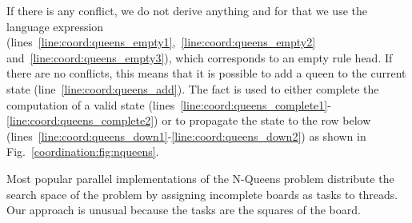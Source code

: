 If there is any conflict, we do not derive anything and for that we use the
language expression 
(lines~\ref{line:coord:queens_empty1},~\ref{line:coord:queens_empty2}
and~\ref{line:coord:queens_empty3}), which corresponds to an empty rule head. If
there are no conflicts, this means that it is possible to add a queen to the
current state (line~\ref{line:coord:queens_add}). The fact  is
used to either complete the computation of a valid state
(lines~\ref{line:coord:queens_complete1}-\ref{line:coord:queens_complete2}) or
to propagate the state to the row below
(lines~\ref{line:coord:queens_down1}-\ref{line:coord:queens_down2}) as shown in
Fig.~\ref{coordination:fig:nqueens}.

Most popular parallel implementations of the N-Queens problem
distribute the search space of the problem by assigning incomplete
boards as tasks to threads. Our approach is unusual because the tasks
are the squares of the board.

